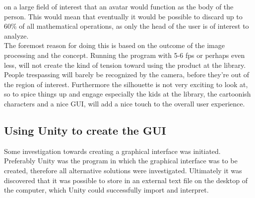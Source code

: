 
 on a large field of interest that an avatar would function as the body of the person. This would mean that eventually it would be possible to discard up to 60{\%} of all mathematical operations, as only the head of the user is of interest to analyze.\\
The foremost reason for doing this is based on the outcome of the image processing and the concept. Running the program with 5-6 fps or perhaps even less, will not create the kind of tension toward using the product at the library. People trespassing will barely be recognized by the camera, before they're out of the region of interest. Furthermore the silhouette is not very exciting to look at, so to spice things up and engage especially the kids at the library, the cartoonish characters and a nice GUI, will add a nice touch to the overall user experience. 

\subsection{Using Unity to create the GUI}
Some investigation towards creating a graphical interface was initiated. Preferably Unity was the program in which the graphical interface was to be created, therefore all alternative solutions were investigated. Ultimately it was discovered that it was possible to store in an external text file on the desktop of the computer, which Unity could successfully import and interpret.\\
  
